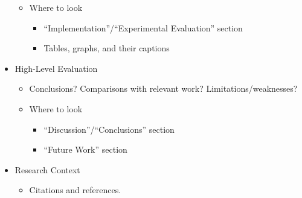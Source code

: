 \documentclass{article}
\begin{document}
\begin{itemize}
\begin{itemize}
        \item Where to look
        \begin{itemize}
            \item ``Implementation''/``Experimental Evaluation'' section
            \item Tables, graphs, and their captions
        \end{itemize}
    \end{itemize}
    \item High-Level Evaluation
    \begin{itemize}
        \item Conclusions? Comparisons with relevant work? Limitations/weaknesses?
        \item Where to look
        \begin{itemize}
            \item ``Discussion''/``Conclusions'' section
            \item ``Future Work'' section
        \end{itemize}
    \end{itemize}
    \item Research Context
    \begin{itemize}
        \item Citations and references.
    \end{itemize}
\end{itemize}
\end{document}
